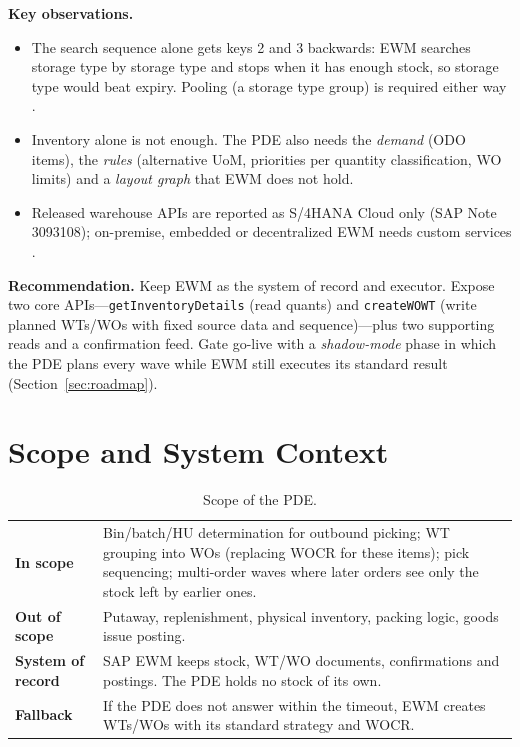 \documentclass[11pt,a4paper]{article}
\newcommand{\api}[1]{\texttt{#1}}
\begin{document}
\textbf{Key observations.}
\begin{itemize}[leftmargin=*,itemsep=2pt]
  \item The search sequence alone gets keys 2 and 3 backwards: EWM searches storage type by storage type and stops when it
        has enough stock, so storage type would beat expiry. Pooling (a storage type group) is required either way \cite{saprem}.
  \item Inventory alone is not enough. The PDE also needs the \emph{demand} (ODO items), the \emph{rules} (alternative UoM,
        priorities per quantity classification, WO limits) and a \emph{layout graph} that EWM does not hold.
  \item Released warehouse APIs are reported as S/4HANA Cloud only (SAP Note 3093108); on-premise, embedded or
        decentralized EWM needs custom services \cite{note}.
\end{itemize}

\textbf{Recommendation.} Keep EWM as the system of record and executor. Expose two core APIs---\api{getInventoryDetails}
(read quants) and \api{createWOWT} (write planned WTs/WOs with fixed source data and sequence)---plus two supporting reads
and a confirmation feed. Gate go-live with a \emph{shadow-mode} phase in which the PDE plans every wave while EWM still executes
its standard result (Section~\ref{sec:roadmap}).

\section{Scope and System Context}
\label{sec:context}
\begin{table}[H]
\centering\small
\begin{tabularx}{\linewidth}{@{}P{3.2cm}L@{}}
\toprule
\textbf{In scope} & Bin/batch/HU determination for outbound picking; WT grouping into WOs (replacing WOCR for these items);
pick sequencing; multi-order waves where later orders see only the stock left by earlier ones. \\
\textbf{Out of scope} & Putaway, replenishment, physical inventory, packing logic, goods issue posting. \\
\textbf{System of record} & SAP EWM keeps stock, WT/WO documents, confirmations and postings. The PDE holds no stock of its own. \\
\textbf{Fallback} & If the PDE does not answer within the timeout, EWM creates WTs/WOs with its standard strategy and WOCR. \\
\bottomrule
\end{tabularx}
\caption{Scope of the PDE.}
\label{tab:scope}
\end{table}
\end{document}
